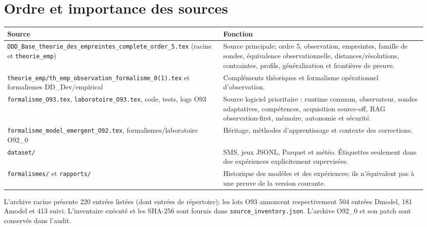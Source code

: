 \documentclass[11pt,a4paper]{report}
\begin{document}
\section{Ordre et importance des sources}
\small
\begin{longtable}{>{\raggedright\arraybackslash}p{.31\linewidth}>{\raggedright\arraybackslash}p{.57\linewidth}}\toprule Source & Fonction \\\midrule
\nolinkurl{DDD_Base_theorie_des_empreintes_complete_order_5.tex} (racine et \texttt{theorie\_emp}) & Source principale; ordre 5, observation, empreintes, famille de sondes, équivalence observationnelle, distances/résolutions, contraintes, profils, généralisation et frontières de preuve. \\
\nolinkurl{theorie_emp/th_emp_observation_formalisme_0(1).tex} et formalismes DD\_Dev/empirical & Compléments théoriques et formalisme opérationnel d'observation. \\
\nolinkurl{formalisme_O93.tex}, \nolinkurl{laboratoire_O93.tex}, code, tests, logs O93 & Source logiciel prioritaire : runtime commun, observateur, sondes adaptatives, compétences, acquisition source-off, RAG observation-first, mémoire, autonomie et sécurité. \\
\nolinkurl{formalisme_model_emergent_O92.tex}, formalismes/laboratoire O92\_0 & Héritage, méthodes d'apprentissage et contexte des corrections. \\
\texttt{dataset/} & SMS, jeux JSONL, Parquet et météo. Étiquettes seulement dans des expériences explicitement supervisées. \\
\texttt{formalismes/} et \texttt{rapports/} & Historique des modèles et des expériences; ils n'équivalent pas à une preuve de la version courante. \\
\bottomrule\end{longtable}\normalsize
L'archive racine présente 220 entrées listées (dont entrées de répertoire); les lots O93 annoncent respectivement 504 entrées Dmodel, 181 Amodel et 413 suivi. L'inventaire exécuté et les SHA-256 sont fournis dans \texttt{source\_inventory.json}. L'archive O92\_0 et son patch sont conservés dans l'audit.
\end{document}
